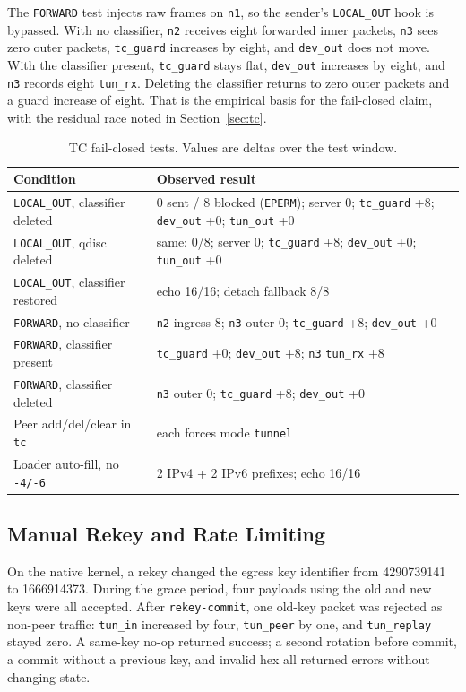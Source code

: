 \documentclass[conference]{IEEEtran}
\newcommand{\code}[1]{\texttt{#1}}
\begin{document}
The \code{FORWARD} test injects raw frames on \code{n1}, so the sender's \code{LOCAL\_OUT} hook is bypassed. With no classifier, \code{n2} receives eight forwarded inner packets, \code{n3} sees zero outer packets, \code{tc\_guard} increases by eight, and \code{dev\_out} does not move. With the classifier present, \code{tc\_guard} stays flat, \code{dev\_out} increases by eight, and \code{n3} records eight \code{tun\_rx}. Deleting the classifier returns to zero outer packets and a guard increase of eight. That is the empirical basis for the fail-closed claim, with the residual race noted in Section~\ref{sec:tc}.

\begin{table}[t]
\centering
\caption{TC fail-closed tests. Values are deltas over the test window.}
\label{tab:guard}
\footnotesize
\setlength{\tabcolsep}{2.5pt}
\begin{tabular}{@{}p{}p{}@{}}
\toprule
Condition & Observed result \\
\midrule
\code{LOCAL\_OUT}, classifier deleted & 0 sent / 8 blocked (\code{EPERM}); server 0; \code{tc\_guard} +8; \code{dev\_out} +0; \code{tun\_out} +0 \\
\code{LOCAL\_OUT}, qdisc deleted & same: 0/8; server 0; \code{tc\_guard} +8; \code{dev\_out} +0; \code{tun\_out} +0 \\
\code{LOCAL\_OUT}, classifier restored & echo 16/16; detach fallback 8/8 \\
\code{FORWARD}, no classifier & \code{n2} ingress 8; \code{n3} outer 0; \code{tc\_guard} +8; \code{dev\_out} +0 \\
\code{FORWARD}, classifier present & \code{tc\_guard} +0; \code{dev\_out} +8; \code{n3} \code{tun\_rx} +8 \\
\code{FORWARD}, classifier deleted & \code{n3} outer 0; \code{tc\_guard} +8; \code{dev\_out} +0 \\
Peer add/del/clear in \code{tc} & each forces mode \code{tunnel} \\
Loader auto-fill, no \code{-4/-6} & 2 IPv4 + 2 IPv6 prefixes; echo 16/16 \\
\bottomrule
\end{tabular}
\end{table}

\subsection{Manual Rekey and Rate Limiting}
On the native kernel, a rekey changed the egress key identifier from 4290739141 to 1666914373. During the grace period, four payloads using the old and new keys were all accepted. After \code{rekey-commit}, one old-key packet was rejected as non-peer traffic: \code{tun\_in} increased by four, \code{tun\_peer} by one, and \code{tun\_replay} stayed zero. A same-key no-op returned success; a second rotation before commit, a commit without a previous key, and invalid hex all returned errors without changing state.
\end{document}
